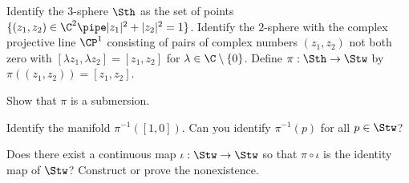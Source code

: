 Identify the $3$-sphere $\Sth$ as the set of points
$\{(z_1,z_2)\in\C^2 \pipe |z_1|^2+|z_2|^2=1\}$. Identify the $2$-sphere with
the complex projective line $\CP^1$ consisting of pairs of complex
numbers $(z_1,z_2)$ not both zero with $[\lambda z_1,\lambda
z_2]=[z_1,z_2]$ for $\lambda\in \C\setminus \{0\}$. Define
$\pi:\Sth\rightarrow \Stw$ by $\pi((z_1,z_2))=[z_1,z_2]$.
\begin{alist}
\item Show that $\pi$ is a submersion.
\item Identify the manifold $\pi^{-1}([1,0])$. Can you identify
$\pi^{-1}(p)$ for all $p\in \Stw$?
\item Does there exist a continuous map $\iota:\Stw\rightarrow \Stw$
so that $\pi\circ \iota$ is the identity map of $\Stw$? Construct or
prove the nonexistence.
\end{alist}
